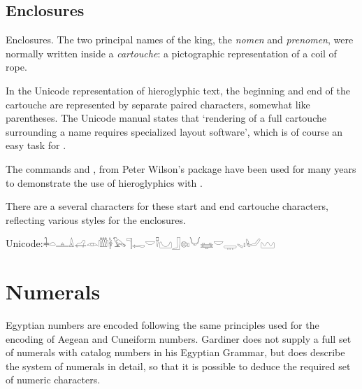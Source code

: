 \subsection{Enclosures}

Enclosures. The two principal names of the king, the \emph{nomen} and \emph{prenomen}, were normally
written inside a \emph{cartouche}: a pictographic representation of a coil of rope.

In the Unicode representation of hieroglyphic text, the beginning and end of the cartouche
are represented by separate paired characters, somewhat like parentheses. The Unicode manual states that `rendering of a full cartouche surrounding a name requires specialized layout software', which is of course an easy task for \tex.

\begin{macro}{\cartouche}
The commands \cmd{\cartouche} and \cmd{\cartouche}, from Peter Wilson's  package have been used for many years to demonstrate the use of hieroglyphics with \latexe. 
\end{macro}

There are a several characters for these start and end cartouche characters, reflecting various styles for the enclosures.


Unicode:{\hiero 𓇓𓏏𓊵𓏙𓊩𓁹𓏃𓋀𓅂𓊹𓉻𓎟𓍋𓈋𓃀𓊖𓏤𓄋𓈐𓎟𓇾𓈅𓏤𓂦𓈉 }

\textpmhg{\HQ} 




\section{Numerals}

Egyptian numbers are encoded following the same principles used for the
encoding of Aegean and Cuneiform numbers. Gardiner does not supply a full set of
numerals with catalog numbers in his Egyptian Grammar, but does describe the system of
numerals in detail, so that it is possible to deduce the required set of numeric characters.

